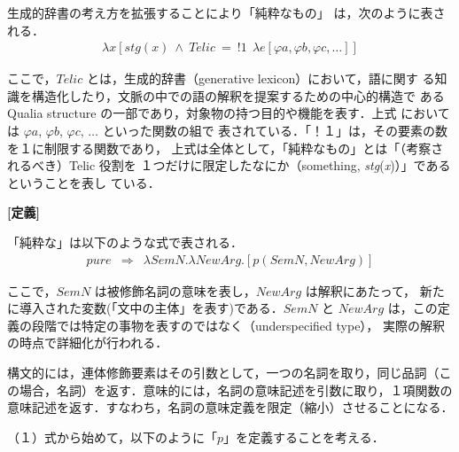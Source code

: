 生成的辞書\cite{Pustejovsky95}の考え方を拡張することにより「純粋なもの」
は，次のように表される．
\begin{eqnarray*}
  \lambda x[stg(x) \ \wedge \ Telic \ =~!1~ \ \lambda e[\varphi a, \varphi b, \varphi c, \ldots ]]  
\end{eqnarray*}

ここで，$Telic$ とは，生成的辞書（generative lexicon）において，語に関す
る知識を構造化したり，文脈の中での語の解釈を提案するための中心的構造で
ある Qualia structure の一部であり，対象物の持つ目的や機能を表す．上式
においては $\varphi a$, $\varphi b$, $\varphi c$, $\ldots$ といった関数の組で
表されている．「！１」は，その要素の数を１に制限する関数であり，
上式は全体として，「純粋なもの」とは「（考察されるべき）Telic 役割を
１つだけに限定したなにか（something, {\it stg}({\it x})）」であるということを表し
ている．

\vspace{0.5cm}
\begin{flushleft}
{\bf [定義]}
\end{flushleft}

「純粋な」は以下のような式で表される．
\begin{eqnarray}
  pure & \Rightarrow & \lambda SemN. \lambda NewArg. [p(SemN,NewArg)] 
\end{eqnarray}

ここで，$SemN$ は被修飾名詞の意味を表し，$NewArg$ は解釈にあたって，
新たに導入された変数(「文中の主体」を表す)である．$SemN$ と $NewArg$
は，この定義の段階では特定の事物を表すのではなく（underspecified type），
実際の解釈の時点で詳細化が行われる．

構文的には，連体修飾要素はその引数として，一つの名詞を取り，同じ品詞（こ
の場合，名詞）を返す．意味的には，名詞の意味記述を引数に取り，１項関数の
意味記述を返す．すなわち，名詞の意味定義を限定（縮小）させることになる． 

（１）式から始めて，以下のように「$p$」を定義することを考える．

